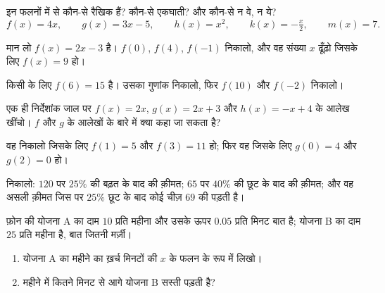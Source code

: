 \begin{exercise}[$\star$]\label{exo:g9:linfunc:1}
इन फलनों में से कौन-से रैखिक हैं? कौन-से एकघाती? और कौन-से न वे, न ये?
\[
f(x) = 4x, \qquad
g(x) = 3x - 5, \qquad
h(x) = x^2, \qquad
k(x) = -\tfrac x2, \qquad
m(x) = 7 .
\]
\end{exercise}

\begin{exercise}[$\star$]\label{exo:g9:linfunc:2}
मान लो $f(x) = 2x - 3$ है। $f(0)$, $f(4)$, $f(-1)$ निकालो, और वह
संख्या $x$ ढूँढ़ो जिसके लिए $f(x) = 9$ हो।
\end{exercise}

\begin{exercise}[$\star$]\label{exo:g9:linfunc:3}
किसी  के लिए $f(6) = 15$ है। उसका गुणांक निकालो, फिर $f(10)$
और $f(-2)$ निकालो।
\end{exercise}

\begin{exercise}[$\star$]\label{exo:g9:linfunc:4}
एक ही निर्देशांक जाल पर $f(x) = 2x$, $g(x) = 2x + 3$ और
$h(x) = -x + 4$ के आलेख खींचो। $f$ और $g$ के आलेखों के बारे में क्या
कहा जा सकता है?
\end{exercise}

\begin{exercise}[$\star$]\label{exo:g9:linfunc:5}
वह  निकालो जिसके लिए $f(1) = 5$ और $f(3) = 11$ हो; फिर वह
जिसके लिए $g(0) = 4$ और $g(2) = 0$ हो।
\end{exercise}

\begin{exercise}[$\star\star$]\label{exo:g9:linfunc:6}
निकालो: $120$ पर $25\%$ की बढ़त के बाद की क़ीमत; $65$ पर $40\%$ की छूट
के बाद की क़ीमत; और वह असली क़ीमत जिस पर $25\%$ छूट के बाद कोई चीज़
$69$ की पड़ती है।
\end{exercise}

\begin{exercise}[$\star\star$]\label{exo:g9:linfunc:7}
फ़ोन की योजना A का दाम $10$ प्रति महीना और उसके ऊपर $0.05$ प्रति मिनट
बात है; योजना B का दाम $25$ प्रति महीना है, बात जितनी मर्ज़ी।
\begin{enumerate}
  \item योजना A का महीने का ख़र्च मिनटों की  $x$ के फलन के रूप
        में लिखो।
  \item महीने में कितने मिनट से आगे योजना B सस्ती पड़ती है?
\end{enumerate}
\end{exercise}

